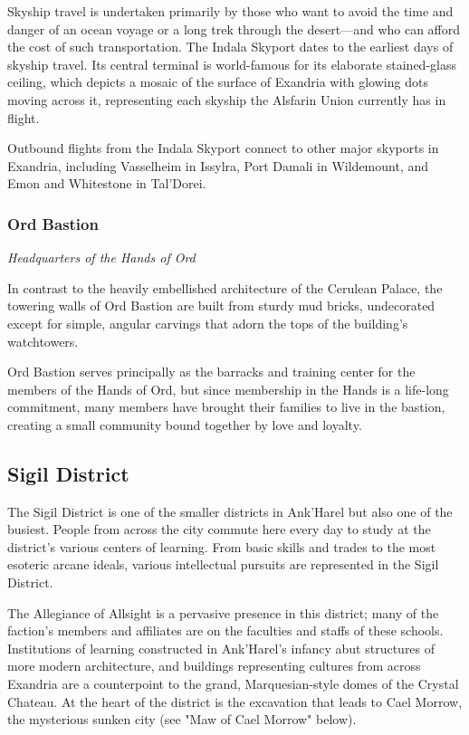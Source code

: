 \documentclass[10pt,a4paper,twoside,fancy,bg=print,twocolumn,openany,nodeprecatedcode]{dndbook}
\begin{document}
Skyship travel is undertaken primarily by those who want to avoid the time and danger of an ocean voyage or a long trek through the desert—and who can afford the cost of such transportation. The Indala Skyport dates to the earliest days of skyship travel. Its central terminal is world-famous for its elaborate stained-glass ceiling, which depicts a mosaic of the surface of Exandria with glowing dots moving across it, representing each skyship the Alsfarin Union currently has in flight.

Outbound flights from the Indala Skyport connect to other major skyports in Exandria, including Vasselheim in Issylra, Port Damali in Wildemount, and Emon and Whitestone in Tal'Dorei.

\subsubsection{Ord Bastion}
\textit{Headquarters of the Hands of Ord}

In contrast to the heavily embellished architecture of the Cerulean Palace, the towering walls of Ord Bastion are built from sturdy mud bricks, undecorated except for simple, angular carvings that adorn the tops of the building's watchtowers.

Ord Bastion serves principally as the barracks and training center for the members of the Hands of Ord, but since membership in the Hands is a life-long commitment, many members have brought their families to live in the bastion, creating a small community bound together by love and loyalty.

\subsection{Sigil District}
The Sigil District is one of the smaller districts in Ank'Harel but also one of the busiest. People from across the city commute here every day to study at the district's various centers of learning. From basic skills and trades to the most esoteric arcane ideals, various intellectual pursuits are represented in the Sigil District.

The Allegiance of Allsight is a pervasive presence in this district; many of the faction's members and affiliates are on the faculties and staffs of these schools. Institutions of learning constructed in Ank'Harel's infancy abut structures of more modern architecture, and buildings representing cultures from across Exandria are a counterpoint to the grand, Marquesian-style domes of the Crystal Chateau. At the heart of the district is the excavation that leads to Cael Morrow, the mysterious sunken city (see "Maw of Cael Morrow" below).
\end{document}
